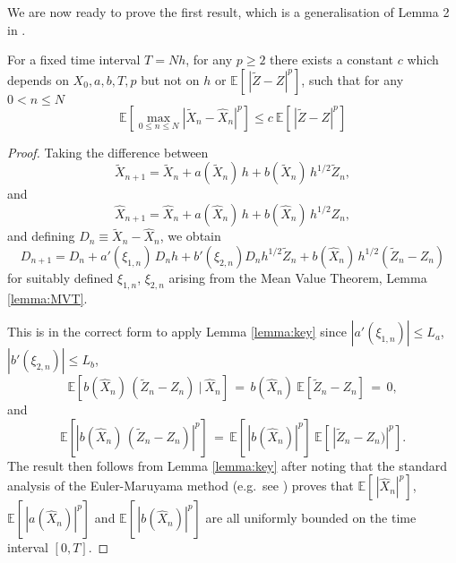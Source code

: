 \documentclass[review]{siamart190516}
\def \EE {{\mathbb{E}}}
\def \tZ {{\widetilde{Z}}}
\def \tXn {{\widetilde{X}_n}}
\def \tXnp {{\widetilde{X}_{n+1}}}
\def \hXn {{\widehat{X}_n}}
\def \hXnp {{\widehat{X}_{n+1}}}
\begin{document}

We are now ready to prove the first result, which is a generalisation 
of Lemma 2 in \cite{ghmr19}.

\begin{lemma}
\label{lemma:first_diff}
For a fixed time interval $T\!=\!N h$, for any $p\!\geq\!2$ there exists a 
constant $c$ which depends on $X_0, a, b, T, p$ but not on $h$ or 
$\EE[\, |\tZ{-}Z|^p]$, such that for any $0\!<\!n\!\leq\!N$
\[
\EE\left[ \max_{0\leq n\leq N}|\tXn{-}\hXn|^p\right] 
\leq c\ \EE[\, |\tZ{-}Z|^p]
\]
\end{lemma}
\begin{proof}
Taking the difference between 
\begin{equation}
  \tXnp = \tXn + a(\tXn)\, h + b(\tXn)\, h^{1/2} \tZ_n,
  \label{eq:original}
\end{equation}
and
\begin{equation}
  \hXnp = \hXn + a(\hXn)\, h + b(\hXn)\, h^{1/2} Z_n,
  \label{eq:approx}
\end{equation}
and defining $D_n \equiv \tXn {-} \hXn$, we obtain
\begin{equation}
D_{n+1} = D_n + a'(\xi_{1,n})\, D_n h + b'(\xi_{2,n}) D_n h^{1/2} \tZ_n
                                 + b(\hXn) \, h^{1/2} (\tZ_n{-}Z_n)
\label{eq:diff}
\end{equation}
for suitably defined $\xi_{1,n}$, $\xi_{2,n}$ arising from the Mean Value Theorem,
Lemma \ref{lemma:MVT}.

This is in the correct form to apply Lemma \ref{lemma:key} since
$|a'(\xi_{1,n})| \leq L_a$, ~
$|b'(\xi_{2,n})| \leq L_b$,
\[
\EE\left[b(\hXn) \, (\tZ_n{-}Z_n)\ |\ \hXn\right] \, =\, b(\hXn) \ \EE[\tZ_n{-}Z_n]\, =\, 0,
\]
and
\[
\EE\left[ |b(\hXn) \, (\tZ_n{-}Z_n)|^p \right]
\, =\, \EE[\, |b(\hXn)|^p] \ \EE[\,|\tZ_n{-}Z_n)|^p ].
\]
The result then follows from Lemma \ref{lemma:key} after noting that
the standard analysis of the Euler-Maruyama method (e.g.\ see \cite{kp92})
proves that $\EE[\, |\hXn|^p]$, $\EE[\, |a(\hXn)|^p]$ and $\EE[\, |b(\hXn)|^p]$ 
are all uniformly bounded on the time interval $[0,T]$.
\end{proof}
\end{document}
